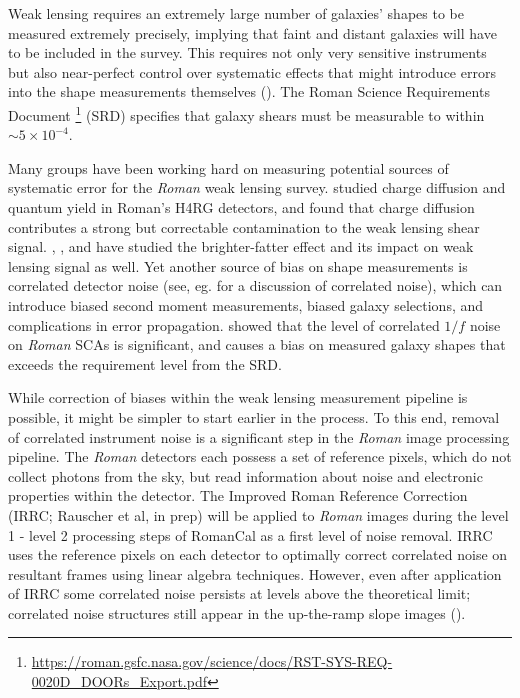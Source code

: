 \documentclass[12pt]{pasj01}
\begin{document}
Weak lensing requires an extremely large number of galaxies' shapes to be measured extremely precisely, implying that faint and distant galaxies will have to be included in the survey. This requires not only very sensitive instruments but also near-perfect control over systematic effects that might introduce errors into the shape measurements themselves (\cite{Mandelbaum2018}). The Roman Science Requirements Document \footnote{\url{https://roman.gsfc.nasa.gov/science/docs/RST-SYS-REQ-0020D_DOORs_Export.pdf}} (SRD) specifies that galaxy shears must be measurable to within $\sim5\times10^{-4}$.

Many groups have been working hard on measuring potential sources of systematic error for the \textit{Roman} weak lensing survey. \cite{Givans2022} studied charge diffusion and quantum yield in Roman's H4RG detectors, and found that charge diffusion contributes a strong but correctable contamination to the weak lensing shear signal. \cite{PlazasMalagon2024}, \cite{Choi2020}, and \cite{Paine2025} have studied the brighter-fatter effect and its impact on weak lensing signal as well.
Yet another source of bias on shape measurements is correlated detector noise (see, eg. \cite{Rauscher2011} for a discussion of correlated noise), which can introduce biased second moment measurements, biased galaxy selections, and complications in error propagation. \cite{Laliotis2024} showed that the level of correlated $1/f$ noise on \textit{Roman} SCAs is significant, and causes a bias on measured galaxy shapes that exceeds the requirement level from the SRD. 

While correction of biases within the weak lensing measurement pipeline is possible, it might be simpler to start earlier in the process. To this end, removal of correlated instrument noise is a significant step in the \textit{Roman} image processing pipeline. The \textit{Roman} detectors each possess a set of reference pixels, which do not collect photons from the sky, but read information about noise and electronic properties within the detector. The Improved Roman Reference Correction (IRRC; Rauscher et al, in prep) will be applied to \textit{Roman} images during the level 1 - level 2 processing steps of RomanCal as a first level of noise removal. IRRC uses the reference pixels on each detector to optimally correct correlated noise on resultant frames using linear algebra techniques. However, even after application of IRRC some correlated noise persists at levels above the theoretical limit; correlated noise structures still appear in the up-the-ramp slope images (\cite{Betti2024}).
\end{document}
